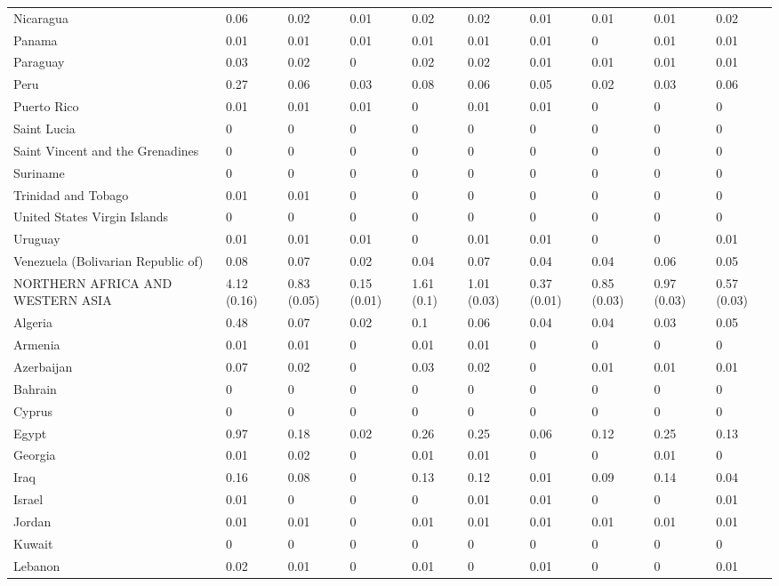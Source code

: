 \begin{longtable}[t]{llllllllll}
Nicaragua & 0.06 & 0.02 & 0.01 & 0.02 & 0.02 & 0.01 & 0.01 & 0.01 & 0.02\\
Panama & 0.01 & 0.01 & 0.01 & 0.01 & 0.01 & 0.01 & 0 & 0.01 & 0.01\\
Paraguay & 0.03 & 0.02 & 0 & 0.02 & 0.02 & 0.01 & 0.01 & 0.01 & 0.01\\
Peru & 0.27 & 0.06 & 0.03 & 0.08 & 0.06 & 0.05 & 0.02 & 0.03 & 0.06\\
Puerto Rico & 0.01 & 0.01 & 0.01 & 0 & 0.01 & 0.01 & 0 & 0 & 0\\
Saint Lucia & 0 & 0 & 0 & 0 & 0 & 0 & 0 & 0 & 0\\
Saint Vincent and the Grenadines & 0 & 0 & 0 & 0 & 0 & 0 & 0 & 0 & 0\\
Suriname & 0 & 0 & 0 & 0 & 0 & 0 & 0 & 0 & 0\\
Trinidad and Tobago & 0.01 & 0.01 & 0 & 0 & 0 & 0 & 0 & 0 & 0\\
United States Virgin Islands & 0 & 0 & 0 & 0 & 0 & 0 & 0 & 0 & 0\\
Uruguay & 0.01 & 0.01 & 0.01 & 0 & 0.01 & 0.01 & 0 & 0 & 0.01\\
Venezuela (Bolivarian Republic of) & 0.08 & 0.07 & 0.02 & 0.04 & 0.07 & 0.04 & 0.04 & 0.06 & 0.05\\
NORTHERN AFRICA AND WESTERN ASIA & 4.12 (0.16) & 0.83 (0.05) & 0.15 (0.01) & 1.61 (0.1) & 1.01 (0.03) & 0.37 (0.01) & 0.85 (0.03) & 0.97 (0.03) & 0.57 (0.03)\\
Algeria & 0.48 & 0.07 & 0.02 & 0.1 & 0.06 & 0.04 & 0.04 & 0.03 & 0.05\\
Armenia & 0.01 & 0.01 & 0 & 0.01 & 0.01 & 0 & 0 & 0 & 0\\
Azerbaijan & 0.07 & 0.02 & 0 & 0.03 & 0.02 & 0 & 0.01 & 0.01 & 0.01\\
Bahrain & 0 & 0 & 0 & 0 & 0 & 0 & 0 & 0 & 0\\
Cyprus & 0 & 0 & 0 & 0 & 0 & 0 & 0 & 0 & 0\\
Egypt & 0.97 & 0.18 & 0.02 & 0.26 & 0.25 & 0.06 & 0.12 & 0.25 & 0.13\\
Georgia & 0.01 & 0.02 & 0 & 0.01 & 0.01 & 0 & 0 & 0.01 & 0\\
Iraq & 0.16 & 0.08 & 0 & 0.13 & 0.12 & 0.01 & 0.09 & 0.14 & 0.04\\
Israel & 0.01 & 0 & 0 & 0 & 0.01 & 0.01 & 0 & 0 & 0.01\\
Jordan & 0.01 & 0.01 & 0 & 0.01 & 0.01 & 0.01 & 0.01 & 0.01 & 0.01\\
Kuwait & 0 & 0 & 0 & 0 & 0 & 0 & 0 & 0 & 0\\
Lebanon & 0.02 & 0.01 & 0 & 0.01 & 0 & 0.01 & 0 & 0 & 0.01\\

\end{longtable}

